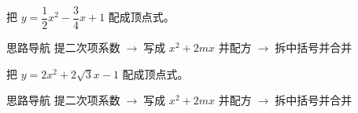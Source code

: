 \documentclass{exam-zh}
\begin{document}
\begin{eduProblemBlock}[例题 4 · $a,b$ 都是分数]
把 $y=\dfrac12x^2-\dfrac34x+1$ 配成顶点式。
\end{eduProblemBlock}





\begin{eduAuxItem}{思路导航}
提二次项系数$\;\to\;$写成 $x^2+2mx$ 并配方$\;\to\;$拆中括号并合并\end{eduAuxItem}





\begin{eduDualExplain}
  \begin{eduExplainLeft}
  \end{eduExplainLeft}

  \begin{eduExplainRight}
  \end{eduExplainRight}
\end{eduDualExplain}




\begin{eduProblemBlock}[例题 5 · 一次项含根号]
把 $y=2x^2+2\sqrt3x-1$ 配成顶点式。
\end{eduProblemBlock}





\begin{eduAuxItem}{思路导航}
提二次项系数$\;\to\;$写成 $x^2+2mx$ 并配方$\;\to\;$拆中括号并合并\end{eduAuxItem}





\begin{eduDualExplain}
  \begin{eduExplainLeft}
  \end{eduExplainLeft}

  \begin{eduExplainRight}
  \end{eduExplainRight}
\end{eduDualExplain}
\end{document}
